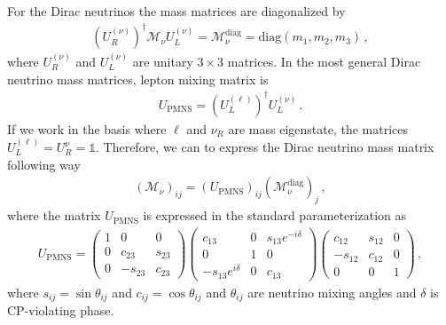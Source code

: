 \documentclass[12pt]{article}
\begin{document}
For the Dirac neutrinos the mass matrices are diagonalized by
\begin{align}
(U^{(\nu)}_R)^{\dagger} \mathcal{M}_{\nu} U^{(\nu)}_L = \mathcal{M}_{\nu}^{\text{diag}} = \text{diag}(m_1, m_2, m_3)\,,
\end{align}
where $U^{(\nu)}_R$ and $U^{(\nu)}_L$  are unitary $3 \times 3$ matrices. In the most general Dirac neutrino mass matrices, lepton mixing matrix is
\begin{align}
U_{\text{PMNS}} = (U^{(\ell)}_L)^{\dagger} U^{(\nu)}_L\,.
\end{align}
If we work in the basis where $\ell$ and $\nu_{R}$ are mass eigenstate, the matrices $U_{L}^{(\ell)} = U_{R}^{\nu} = \mathds{1}$. Therefore, we can to express the Dirac neutrino mass matrix following way
\begin{align}
(\mathcal{M}_{\nu})_{ij} = (U_{\text{PMNS}})_{ij} (\mathcal{M}_{\nu}^{\text{diag}})_{j}\,,
\end{align}
where the matrix $U_{\text{PMNS}}$ is expressed in the standard parameterization as
\begin{align}
U_{\text{PMNS}} = \begin{pmatrix}
    1 & 0		& 0 \\
    0 & c_{23}  & s_{23} \\
    0 & -s_{23} & c_{23}
\end{pmatrix}
\begin{pmatrix}
    c_{13}  &  0 & s_{13}e^{-i\delta} \\
    0 		&  1 & 0 \\
    -s_{13}e^{i\delta} &  0 & c_{13}
\end{pmatrix}
\begin{pmatrix}
    c_{12}  & s_{12} & 0 \\
    -s_{12} & c_{12} & 0 \\
    0		& 0		 & 1
\end{pmatrix}\,,
\end{align}
where $s_{ij} = \sin \theta_{ij}$ and $c_{ij} = \cos \theta_{ij}$ and $\theta_{ij}$ are neutrino mixing angles and $\delta$ is CP-violating phase.
\end{document}
